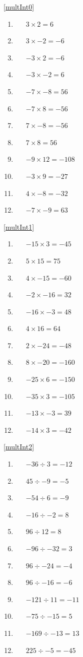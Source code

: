 \documentclass[a4paper,12pt]{article}
\begin{document}
\ref{multInt0}
	\begin{multicols}{3}
	\begin{enumerate}[label=\footnotesize \roman*)]
		\item~~~$3\times2=6$
		\item~~~$3\times-2=-6$
		\item~~~$-3\times2=-6$
		\item~~~$-3\times-2=6$
		\item~~~$-7\times-8=56$
		\item~~~$-7\times8=-56$
		\item~~~$7\times-8=-56$
		\item~~~$7\times8=56$
		\item~~~$-9\times12=-108$
		\item~~~$-3\times9=-27$
		\item~~~$4\times-8=-32$
		\item~~~$-7\times-9=63$
	\end{enumerate}
\end{multicols}
\ref{multInt1}
	\begin{multicols}{3}
	\begin{enumerate}[label=\footnotesize \roman*)]
		\item~~~$-15\times3=-45$
		\item~~~$5\times15=75$
		\item~~~$4\times-15=-60$
		\item~~~$-2\times-16=32$
		\item~~~$-16\times -3=48$
		\item~~~$4\times16=64$
		\item~~~$2\times-24=-48$
		\item~~~$8\times-20=-160$
		\item~~~$-25\times6=-150$
		\item~~~$-35\times3=-105$
		\item~~~$-13\times-3=39$
		\item~~~$-14\times3=-42$
	\end{enumerate}
\end{multicols}
\ref{multInt2}
	\begin{multicols}{3}
	\begin{enumerate}[label=\footnotesize \roman*)]
		\item~~~$-36\div3=-12$
		\item~~~$45\div-9=-5$
		\item~~~$-54\div6=-9$
		\item~~~$-16\div-2=8$
		\item~~~$96\div12=8$
		\item~~~$-96\div-32=3$
		\item~~~$96\div-24=-4$
		\item~~~$96\div-16=-6$
		\item~~~$-121\div11=-11$
		\item~~~$-75\div-15=5$
		\item~~~$-169\div-13=13$
		\item~~~$225\div-5=-45$
	\end{enumerate}
\end{multicols}
\end{document}
